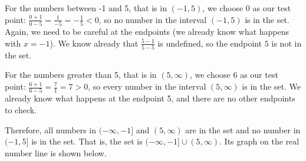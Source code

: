 \documentclass[11pt]{book}               %
\begin{document}
For the numbers between -1 and 5, that is in $(-1, 5)$, we choose 0 as our test point:
$\frac{0+1}{0-5}=\frac{1}{-5}=-\frac{1}{5}<0$, so no number in the interval $(-1,5)$ is in the set.
Again, we need to be careful at the endpoints (we already know what happens with $x = -1$).
We know already that $\frac{5-1}{5-5}$ is undefined, so the endpoint $5$ is not in the set.

For the numbers greater than 5, that is in $(5, \infty)$, we choose 6 as our test point:
$\frac{6+1}{6-5}=\frac{7}{1}=7>0$, so every number in the interval $(5,\infty)$ is in the set.
We already know what happens at the endpoint 5, and there are no other endpoints to check.

Therefore, all numbers in $(-\infty,-1]$ and $(5,\infty)$ are in the set and no number in $(-1,5]$ is in the set. 
That is, the set is $(-\infty,-1] \cup (5,\infty)$.  Its graph on the real number line is shown below.

\begin{center}
\end{center}
\end{document}
